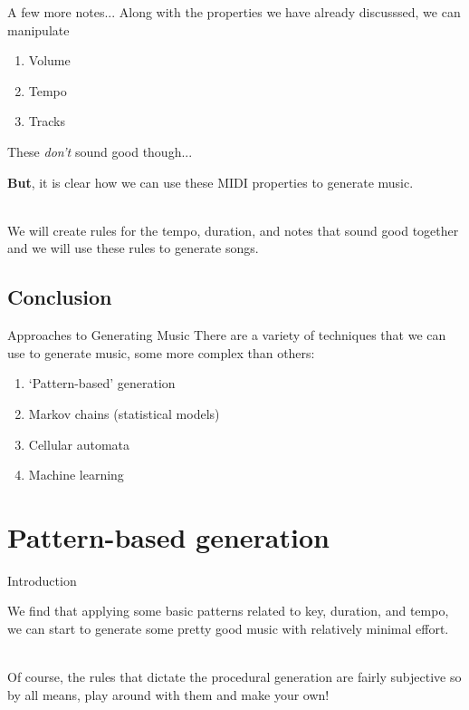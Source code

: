 \documentclass{beamer}
\begin{document}
\begin{frame}{A few more notes...}
Along with the properties we have already discusssed, we can manipulate
\begin{enumerate}
    \item Volume
    \item Tempo
    \item Tracks
\end{enumerate}
\end{frame}

\begin{frame}{These \textit{don't} sound good though...}
\par{\LARGE{\textbf{But}, it is clear how we can use these MIDI properties to generate music.}\\~\ }
\par{We will create rules for the tempo, duration, and notes that sound good together and we will use these rules to generate songs.}
\end{frame}
\subsection*{Conclusion}
\begin{frame}{Approaches to Generating Music}
There are a variety of techniques that we can use to generate music, some more complex than others:
\begin{enumerate}
    \item `Pattern-based' generation
    \item Markov chains (statistical models)
    \item Cellular automata
    \item Machine learning
\end{enumerate}
\end{frame}

\section{Pattern-based generation}
\begin{frame}{Introduction}
\par{We find that applying some basic patterns related to key, duration, and tempo, we can start to generate some pretty good music with relatively minimal effort.\\~\ }

\par{Of course, the rules that dictate the procedural generation are fairly subjective so by all means, play around with them and make your own!}
\end{frame}
\end{document}
